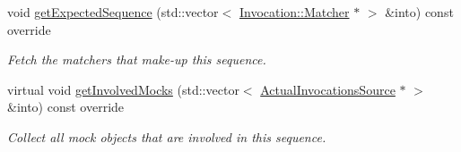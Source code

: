 \begin{DoxyCompactItemize}
\item 
void \mbox{\hyperlink{classfakeit_1_1ConcatenatedSequence_a176b1d4dac2e552f646c2c3ce98f0d1f}{get\+Expected\+Sequence}} (std\+::vector$<$ \mbox{\hyperlink{structfakeit_1_1Invocation_1_1Matcher}{Invocation\+::\+Matcher}} $\ast$ $>$ \&into) const override
\begin{DoxyCompactList}\small\item\em Fetch the matchers that make-\/up this sequence. \end{DoxyCompactList}\item 
virtual void \mbox{\hyperlink{classfakeit_1_1ConcatenatedSequence_a3b475e68ab4f750f2d4946e4777ebe30}{get\+Involved\+Mocks}} (std\+::vector$<$ \mbox{\hyperlink{structfakeit_1_1ActualInvocationsSource}{Actual\+Invocations\+Source}} $\ast$ $>$ \&into) const override
\begin{DoxyCompactList}\small\item\em Collect all mock objects that are involved in this sequence. \end{DoxyCompactList}\end{DoxyCompactItemize}
